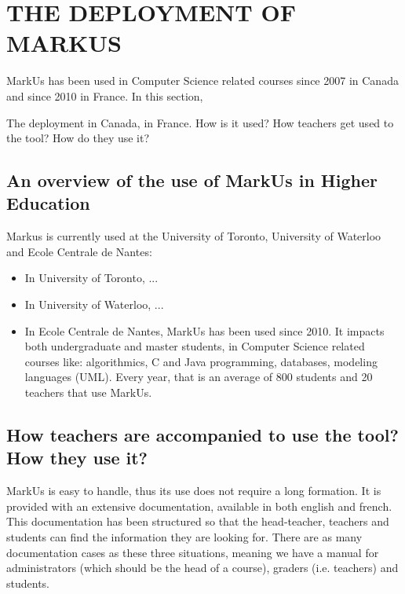 \documentclass[twocolumn,10pt]{asme2e}
\begin{document}


\section*{THE DEPLOYMENT OF MARKUS}

MarkUs has been used in Computer Science related courses since 2007 in Canada and since 2010 in France. In this section, 

The deployment in Canada, in France. How is it used? How teachers get used to the tool? How do they use it?

\subsection*{An overview of the use of MarkUs in Higher Education}

Markus is currently used at the University of Toronto, University of Waterloo and Ecole Centrale de Nantes: 
\begin{itemize}
\item In University of Toronto, ... %
\item In University of Waterloo, ... %
\item In Ecole Centrale de Nantes, MarkUs has been used since 2010. It impacts both undergraduate and master students, in Computer Science related courses like: algorithmics, C and Java programming, databases, modeling languages (UML). Every year, that is an average of 800 students and 20 teachers that use MarkUs. %
\end{itemize}

\subsection*{How teachers are accompanied to use the tool? How they use it?}

MarkUs is easy to handle, thus its use does not require a long formation. It is provided with an extensive documentation, available in both english and french. This documentation has been structured so that the head-teacher, teachers and students can find the information they are looking for. There are as many documentation cases as these three situations, meaning we have a manual for administrators (which should be the head of a course), graders (i.e. teachers) and students. 
\end{document}
